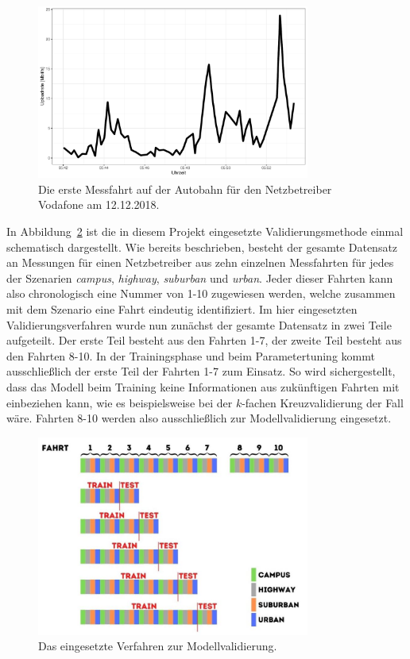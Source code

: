 \begin{figure}
    \centering
    \includegraphics[width=0.8\textwidth]{abbildungen/highway_drive_vodafone}
    \caption{Die erste Messfahrt auf der Autobahn f\"ur den Netzbetreiber Vodafone am 12.12.2018.}
    \label{fig:messfahrt-vodafone}
\end{figure}

In Abbildung~\ref{fig:validierung} ist die in diesem Projekt eingesetzte Validierungsmethode einmal schematisch dargestellt.
Wie bereits beschrieben, besteht der gesamte Datensatz an Messungen f\"ur einen Netzbetreiber aus zehn einzelnen Messfahrten f\"ur
jedes der Szenarien \textit{campus}, \textit{highway}, \textit{suburban} und \textit{urban}.
Jeder dieser Fahrten kann also chronologisch eine Nummer von 1-10 zugewiesen werden, welche zusammen mit dem Szenario
eine Fahrt eindeutig identifiziert.
Im hier eingesetzten Validierungsverfahren wurde nun zun\"achst der gesamte Datensatz in zwei Teile aufgeteilt.
Der erste Teil besteht aus den Fahrten 1-7, der zweite Teil besteht aus den Fahrten 8-10.
In der Trainingsphase und beim Parametertuning kommt ausschlie{\ss}lich der erste Teil der Fahrten 1-7 zum Einsatz.
So wird sichergestellt, dass das Modell beim Training keine Informationen aus zuk\"unftigen Fahrten mit einbeziehen kann, wie
es beispielsweise bei der $k$-fachen Kreuzvalidierung der Fall w\"are. Fahrten 8-10 werden also ausschlie{\ss}lich zur Modellvalidierung
eingesetzt.

\begin{figure}
    \centering
    \includegraphics[width=0.8\textwidth]{abbildungen/validierung}
    \caption{Das eingesetzte Verfahren zur Modellvalidierung.}
    \label{fig:validierung}
\end{figure}

